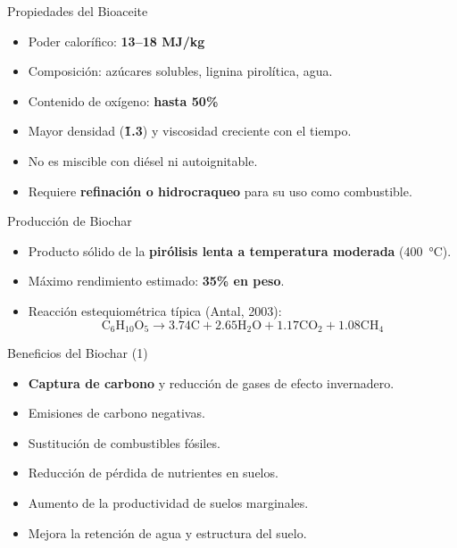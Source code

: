 \documentclass[../../main.tex]{subfiles}
\begin{document}
\begin{frame}{Propiedades del Bioaceite}
\small
\begin{itemize}
  \item Poder calorífico: \textbf{13–18 MJ/kg}
  \item Composición: azúcares solubles, lignina pirolítica, agua.
  \item Contenido de oxígeno: \textbf{hasta 50\%}
  \item Mayor densidad (\textbf{\~1.3}) y viscosidad creciente con el tiempo.
  \item No es miscible con diésel ni autoignitable.
  \item Requiere \textbf{refinación o hidrocraqueo} para su uso como combustible.
\end{itemize}
\end{frame}

\begin{frame}{Producción de Biochar}
\small
\begin{itemize}
  \item Producto sólido de la \textbf{pirólisis lenta a temperatura moderada} (\SI{400}{\degreeCelsius}).
  \item Máximo rendimiento estimado: \textbf{35\% en peso}.
  \item Reacción estequiométrica típica (Antal, 2003):
  \begin{equation*}
    \text{C}_6\text{H}_{10}\text{O}_5 \rightarrow 3.74\text{C} + 2.65\text{H}_2\text{O} + 1.17\text{CO}_2 + 1.08\text{CH}_4
  \end{equation*}
\end{itemize}
\end{frame}

\begin{frame}{Beneficios del Biochar (1)}
\small
\begin{itemize}
  \item \textbf{Captura de carbono} y reducción de gases de efecto invernadero.
  \item Emisiones de carbono negativas.
  \item Sustitución de combustibles fósiles.
  \item Reducción de pérdida de nutrientes en suelos.
  \item Aumento de la productividad de suelos marginales.
  \item Mejora la retención de agua y estructura del suelo.
\end{itemize}
\end{frame}
\end{document}
